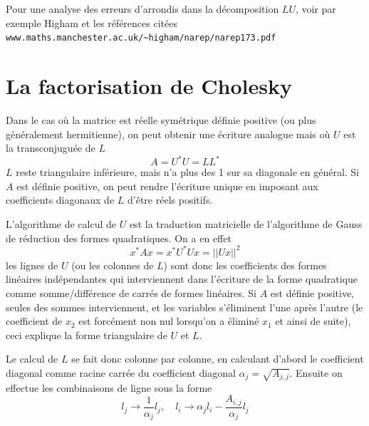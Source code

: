 \documentclass[a4paper,11pt]{book}
\begin{document}
\begin{giacjshere}
Pour une analyse des erreurs d'arrondis dans la d\'ecomposition
$LU$, voir par exemple Higham et les r\'ef\'erences cit\'ees\\
\verb|www.maths.manchester.ac.uk/~higham/narep/narep173.pdf|

\section{La factorisation de Cholesky} 
Dans le cas o\`u la matrice est r\'eelle sym\'etrique d\'efinie
positive (ou plus g\'en\'eralement hermitienne), 
on peut obtenir une \'ecriture analogue
mais o\`u $U$ est la transconjugu\'ee de $L$
\[ A=U^* U = L L^* \]
$L$ reste triangulaire
inf\'erieure, mais n'a plus des 1 sur sa diagonale en g\'en\'eral. Si
$A$ est d\'efinie positive, on peut rendre l'\'ecriture unique en
imposant aux coefficients diagonaux de $L$ d'\^etre r\'eels positifs.

L'algorithme de calcul de $U$ est la traduction matricielle de l'algorithme
de Gauss de réduction des formes quadratiques. On a en effet
\[ x^* A x=x^* U^* U x = ||Ux||^2 \]
les lignes de $U$ (ou les colonnes de $L$) sont donc les coefficients
des formes linéaires indépendantes qui interviennent dans l'écriture
de la forme quadratique comme somme/différence de carrés de formes
linéaires. Si $A$
est définie positive, seules des sommes interviennent, et les
variables s'éliminent l'une après l'autre (le coefficient de $x_2$ est forcément
non nul lorsqu'on a éliminé $x_1$ et ainsi de suite), ceci explique
la forme triangulaire de $U$ et $L$.

Le calcul de $L$ se fait donc colonne par colonne, en calculant d'abord le
coefficient diagonal comme racine carr\'ee du coefficient diagonal 
$\alpha_j=\sqrt{A_{j,j}}$.
Ensuite on effectue les combinaisons de ligne sous la forme
\[ l_j \rightarrow \frac{1}{\alpha_j}l_j, \quad  l_i \rightarrow \alpha_j l_i - \frac{A_{i,j}}{\alpha_j} l_j \]


\end{giacjshere}
\end{document}
